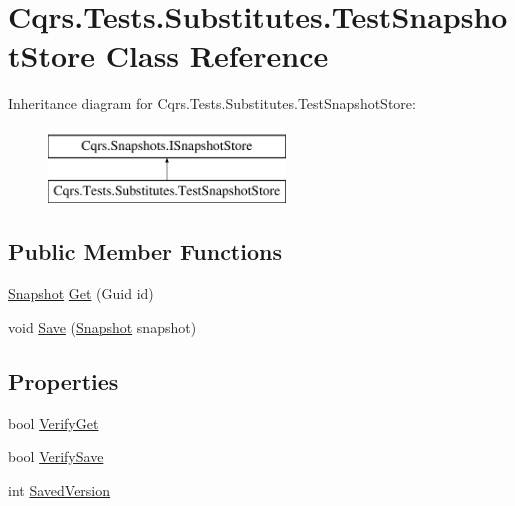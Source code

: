 \hypertarget{classCqrs_1_1Tests_1_1Substitutes_1_1TestSnapshotStore}{}\section{Cqrs.\+Tests.\+Substitutes.\+Test\+Snapshot\+Store Class Reference}
\label{classCqrs_1_1Tests_1_1Substitutes_1_1TestSnapshotStore}
Inheritance diagram for Cqrs.\+Tests.\+Substitutes.\+Test\+Snapshot\+Store\+:\begin{figure}[H]
\begin{center}
\leavevmode
\includegraphics[height=2.000000cm]{classCqrs_1_1Tests_1_1Substitutes_1_1TestSnapshotStore}
\end{center}
\end{figure}
\subsection*{Public Member Functions}
\begin{DoxyCompactItemize}
\item 
\hyperlink{classCqrs_1_1Snapshots_1_1Snapshot}{Snapshot} \hyperlink{classCqrs_1_1Tests_1_1Substitutes_1_1TestSnapshotStore_a8f07b513e21a7ed7ea0f52a41c9586ba_a8f07b513e21a7ed7ea0f52a41c9586ba}{Get} (Guid id)
\item 
void \hyperlink{classCqrs_1_1Tests_1_1Substitutes_1_1TestSnapshotStore_a223dbc9583120dec1469c1f84b863eae_a223dbc9583120dec1469c1f84b863eae}{Save} (\hyperlink{classCqrs_1_1Snapshots_1_1Snapshot}{Snapshot} snapshot)
\end{DoxyCompactItemize}
\subsection*{Properties}
\begin{DoxyCompactItemize}
\item 
bool \hyperlink{classCqrs_1_1Tests_1_1Substitutes_1_1TestSnapshotStore_a30735e964f5ebe4502f4e3b6740b94e5_a30735e964f5ebe4502f4e3b6740b94e5}{Verify\+Get}
\item 
bool \hyperlink{classCqrs_1_1Tests_1_1Substitutes_1_1TestSnapshotStore_afcd205610fd1bcb6c02884200f1c95f4_afcd205610fd1bcb6c02884200f1c95f4}{Verify\+Save}
\item 
int \hyperlink{classCqrs_1_1Tests_1_1Substitutes_1_1TestSnapshotStore_a6fd401fb82c4f82d32ef38c8fd964fb5_a6fd401fb82c4f82d32ef38c8fd964fb5}{Saved\+Version}
\end{DoxyCompactItemize}


